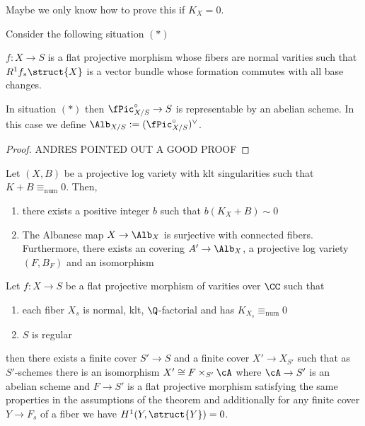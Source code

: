 \documentclass[12pt]{article}
\begin{document}
{\color{red} Maybe we only know how to prove this if $K_X = 0$.}

\begin{defn}
Consider the following situation $(*)$
\begin{center}
$f : X \to S$ is a flat projective morphism whose fibers are normal varities such that $R^1 f_* \struct{X}$ is a vector bundle whose formation commutes with all base changes.
\end{center}
\end{defn}

\begin{lemma}
In situation $(*)$ then $\fPic_{X/S}^\circ \to S$ is representable by an abelian scheme. In this case we define $\Alb_{X/S} := (\fPic_{X/S}^{\circ})^\vee$.
\end{lemma}

\begin{proof}
{\color{red} ANDRES POINTED OUT A GOOD PROOF}
\end{proof}


\begin{theorem}[Ambro]
Let $(X, B)$ be a projective log variety with klt singularities such that $K + B \equiv_{\text{num}} 0$. Then,
\begin{enumerate}
\item there exists a positive integer $b$ such that $b(K_X + B) \sim 0$ 
\item The Albanese map $X \to \Alb_X$ is surjective with connected fibers. Furthermore, there exists an \etale covering $A' \to \Alb_X$, a projective log variety $(F, B_F)$ and an isomorphism
\begin{center}
\end{center}
\end{enumerate}
\end{theorem}


\newcommand{\Isom}{\mathrm{Isom}}

\begin{theorem}
Let $f : X \to S$ be a flat projective morphism of varities over $\CC$ such that
\begin{enumerate}
\item each fiber $X_s$ is normal, klt, $\Q$-factorial and has $K_{X_s} \equiv_{\text{num}} 0$ 
\item $S$ is regular
\end{enumerate}
then there exists a finite \etale cover $S' \to S$ and a finite \etale cover $X' \to X_{S'}$ such that as $S'$-schemes there is an isomorphism $X' \cong F \times_{S'} \cA$ where $\cA \to S'$ is an abelian scheme and $F \to S'$ is a flat projective morphism satisfying the same properties in the assumptions of the theorem and additionally for any finite \etale cover $Y \to F_s$ of a fiber we have $H^1(Y, \struct{Y}) = 0$.
\end{theorem}
\end{document}
